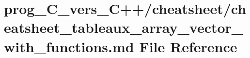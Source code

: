 \hypertarget{prog__C__vers__C_09_09_2cheatsheet_2cheatsheet__tableaux__array__vector__with__functions_8md}{}\section{prog\+\_\+\+C\+\_\+vers\+\_\+\+C++/cheatsheet/cheatsheet\+\_\+tableaux\+\_\+array\+\_\+vector\+\_\+with\+\_\+functions.md File Reference}
\label{prog__C__vers__C_09_09_2cheatsheet_2cheatsheet__tableaux__array__vector__with__functions_8md}
